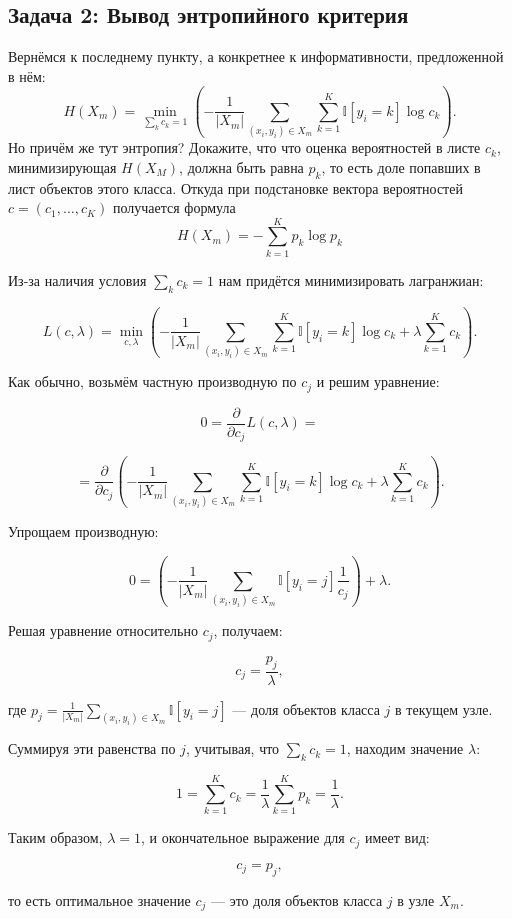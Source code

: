 \subsection{Задача 2: Вывод энтропийного критерия}
Вернёмся к последнему пункту, а конкретнее к информативности, предложенной в нём:
\[
H(X_m) = \min_{\sum_k c_k = 1} \left( -\frac{1}{|X_m|} \sum_{(x_i, y_i) \in X_m} \sum_{k=1}^K \mathbb{I}[y_i = k] \log c_k \right).
\]
Но причём же тут энтропия? Докажите, что что оценка вероятностей в листе $c_{k}$, минимизирующая $H(X_M)$, должна быть равна $p_k$, то есть доле попавших в лист объектов этого класса. Откуда при подстановке вектора вероятностей $c = (c_1, \dots, c_K)$ получается формула
\[
H(X_m) = - \sum_{k=1}^K p_k \log p_k
\]
\begin{solution}
    Из-за наличия условия $\sum_k c_k = 1$ нам придётся минимизировать лагранжиан:

\[
L(c, \lambda) = \min_{c, \lambda} \left( -\frac{1}{|X_m|} \sum_{(x_i, y_i) \in X_m} \sum_{k=1}^K \mathbb{I}[y_i = k] \log c_k + \lambda \sum_{k=1}^K c_k \right).
\]

Как обычно, возьмём частную производную по $c_j$ и решим уравнение:

\[
0 = \frac{\partial}{\partial c_j} L(c, \lambda) =
\]

\[
= \frac{\partial}{\partial c_j} \left( -\frac{1}{|X_m|} \sum_{(x_i, y_i) \in X_m} \sum_{k=1}^K \mathbb{I}[y_i = k] \log c_k + \lambda \sum_{k=1}^K c_k \right).
\]

Упрощаем производную:

\[
0 = \left( -\frac{1}{|X_m|} \sum_{(x_i, y_i) \in X_m} \mathbb{I}[y_i = j] \frac{1}{c_j} \right) + \lambda.
\]

Решая уравнение относительно $c_j$, получаем:

\[
c_j = \frac{p_j}{\lambda},
\]

где $p_j = \frac{1}{|X_m|} \sum_{(x_i, y_i) \in X_m} \mathbb{I}[y_i = j]$ — доля объектов класса $j$ в текущем узле.

Суммируя эти равенства по $j$, учитывая, что $\sum_k c_k = 1$, находим значение $\lambda$:

\[
1 = \sum_{k=1}^K c_k = \frac{1}{\lambda} \sum_{k=1}^K p_k = \frac{1}{\lambda}.
\]

Таким образом, $\lambda = 1$, и окончательное выражение для $c_j$ имеет вид:

\[
c_j = p_j,
\]

то есть оптимальное значение $c_j$ — это доля объектов класса $j$ в узле $X_m$.
\end{solution}

